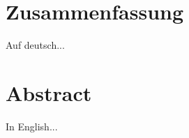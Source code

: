 \section*{Zusammenfassung}
\vspace*{1em}

Auf deutsch...

\blankpage

\section*{Abstract}
\vspace*{1em}

In English...


